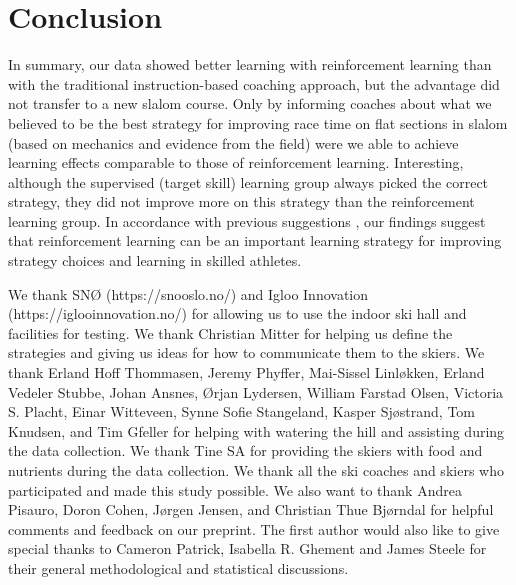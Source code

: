 \documentclass[pdflatex,sn-nature]{sn-jnl}%
\theoremstyle{thmstyleone}%
\theoremstyle{thmstyletwo}%
\theoremstyle{thmstylethree}%
\begin{document}
\section{Conclusion}
In summary, our data showed better learning with reinforcement learning than with the traditional instruction-based coaching approach, but the advantage did not transfer to a new slalom course. Only by informing coaches about what we believed to be the best strategy for improving race time on flat sections in slalom (based on mechanics and evidence from the field) were we able to achieve learning effects comparable to those of reinforcement learning. Interesting, although the supervised (target skill) learning group always picked the correct strategy, they did not improve more on this strategy than the reinforcement learning group. In accordance with previous suggestions \cite{hodges_errors_2020, yarrow_inside_2009}, our findings suggest that reinforcement learning can be an important learning strategy for improving strategy choices and learning in skilled athletes. 

\backmatter





We thank SNØ (https://snooslo.no/) and Igloo Innovation (https://iglooinnovation.no/) for allowing us to use the indoor ski hall and facilities for testing. We thank Christian Mitter for helping us define the strategies and giving us ideas for how to communicate them to the skiers. We thank Erland Hoff Thommasen, Jeremy Phyffer, Mai-Sissel Linløkken, Erland Vedeler Stubbe, Johan Ansnes, Ørjan Lydersen, William Farstad Olsen, Victoria S. Placht, Einar Witteveen, Synne Sofie Stangeland, Kasper Sjøstrand, Tom Knudsen, and Tim Gfeller for helping with watering the hill and assisting during the data collection. We thank Tine SA for providing the skiers with food and nutrients during the data collection. We thank all the ski coaches and skiers who participated and made this study possible. We also want to thank Andrea Pisauro, Doron Cohen, Jørgen Jensen, and Christian Thue Bjørndal for helpful comments and feedback on our preprint. The first author would also like to give special thanks to Cameron Patrick, Isabella R. Ghement and James Steele for their general methodological and statistical discussions.
\end{document}
